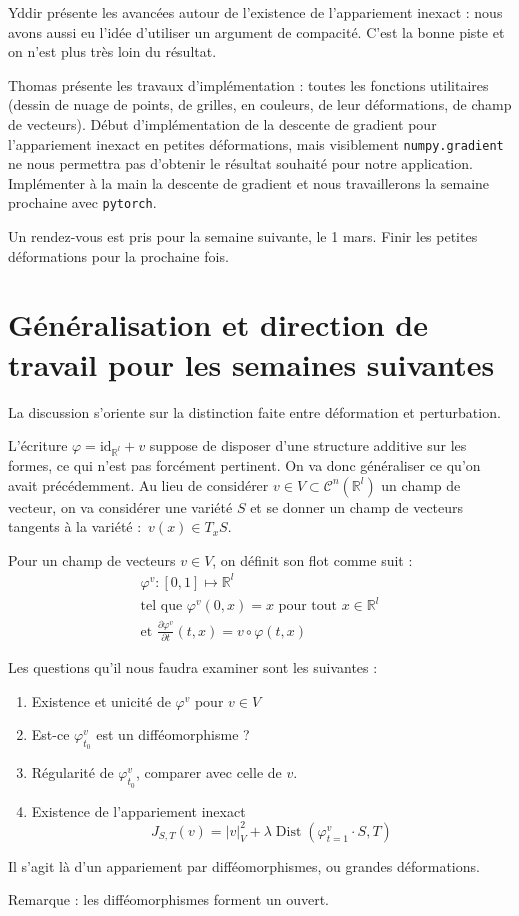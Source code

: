 \documentclass{article}
\newcommand*{\Rl}{\mathbb{R}^l}
\newcommand*{\id}{\text{id}_{\Rl}}
\DeclareMathOperator{\Dist}{Dist}
\begin{document}
Yddir présente les avancées autour de l'existence de l'appariement inexact : nous avons aussi eu l'idée d'utiliser un argument de compacité. C'est la bonne piste et on n'est plus très loin du résultat.

Thomas présente les travaux d'implémentation : toutes les fonctions utilitaires (dessin de nuage de points, de grilles, en couleurs, de leur déformations, de champ de vecteurs). Début d'implémentation de la descente de gradient pour l'appariement inexact en petites déformations, mais visiblement \texttt{numpy.gradient} ne nous permettra pas d'obtenir le résultat souhaité pour notre application. Implémenter à la main la descente de gradient et nous travaillerons la semaine prochaine avec \texttt{pytorch}.

Un rendez-vous est pris pour la semaine suivante, le 1 mars. Finir les petites déformations pour la prochaine fois.

\section{Généralisation et direction de travail pour les semaines suivantes}

La discussion s'oriente sur la distinction faite entre \og{}déformation\fg{} et \og{}perturbation\fg{}. 

L'écriture \( \varphi = \id + v \) suppose de disposer d'une structure additive sur les formes, ce qui n'est pas forcément pertinent. On va donc généraliser ce qu'on avait précédemment. Au lieu de considérer \( v \in V \subset \mathcal{C}^n(\Rl) \) un champ de vecteur, on va considérer une variété \( S \) et se donner un champ de vecteurs tangents à la variété : \( v(x) \in T_x S\).

Pour un champ de vecteurs \( v \in V \), on définit son \og{}flot\fg{} comme suit :
\begin{align*}
    \varphi^v : [0,1] \mapsto \Rl \\
    \text{tel que } \varphi^v(0,x) = x \text{ pour tout } x \in \Rl \\
    \text{et } \frac{\partial \varphi^v}{\partial t} (t, x) = v \circ \varphi(t, x)
\end{align*}

Les questions qu'il nous faudra examiner sont les suivantes :
\begin{enumerate}
    \item Existence et unicité de \( \varphi^v \) pour \( v \in V \)
    \item Est-ce \( \varphi^v_{t_0} \) est un difféomorphisme ?
    \item Régularité de \(\varphi^v_{t_0} \), comparer avec celle de \( v \).
    \item Existence de l'appariement inexact \[ J_{S, T} (v) = |v|_{V}^2 + \lambda \Dist(\varphi^v_{t=1} \cdot S,T)\]
\end{enumerate}

Il s'agit là d'un appariement par difféomorphismes, ou \og{}grandes déformations\fg{}.

Remarque : les difféomorphismes forment un ouvert.
\end{document}
